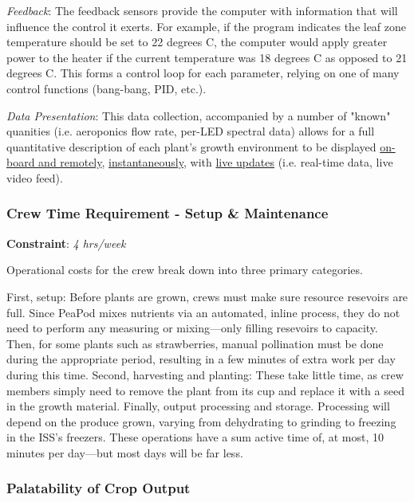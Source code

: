 \documentclass{report}
\begin{document}
\textit{Feedback}: The feedback sensors provide the computer with information that will influence the control it exerts. For example, if the program indicates the leaf zone temperature should be set to 22 degrees C, the computer would apply greater power to the heater if the current temperature was 18 degrees C as opposed to 21 degrees C. This forms a control loop for each parameter, relying on one of many control functions (bang-bang, PID, etc.).

\textit{Data Presentation}: This data collection, accompanied by a number of "known" quanities (i.e. aeroponics flow rate, per-LED spectral data) allows for a full quantitative description of each plant's growth environment to be displayed \uline{on-board and remotely}, \uline{instantaneously}, with \uline{live updates} (i.e. real-time data, live video feed).


\subsubsection{Crew Time Requirement - Setup \& Maintenance}
\label{sec:constraints-crewtime} 

\textbf{Constraint}: \textit{4 hrs/week}

Operational costs for the crew break down into three primary categories.

First, setup: Before plants are grown, crews must make sure resource resevoirs are full. Since PeaPod mixes nutrients via an automated, inline process, they do not need to perform any measuring or mixing---only filling resevoirs to capacity. Then, for some plants such as strawberries, manual pollination must be done during the appropriate period, resulting in a few minutes of extra work per day during this time. Second, harvesting and planting: These take little time, as crew members simply need to remove the plant from its cup and replace it with a seed in the growth material. Finally, output processing and storage. Processing will depend on the produce grown, varying from dehydrating to grinding to freezing in the ISS's freezers. These operations have a sum active time of, at most, 10 minutes per day---but most days will be far less.


\newpage

\subsubsection{Palatability of Crop Output} 
\label{sec:constraints-palatability}
\end{document}
